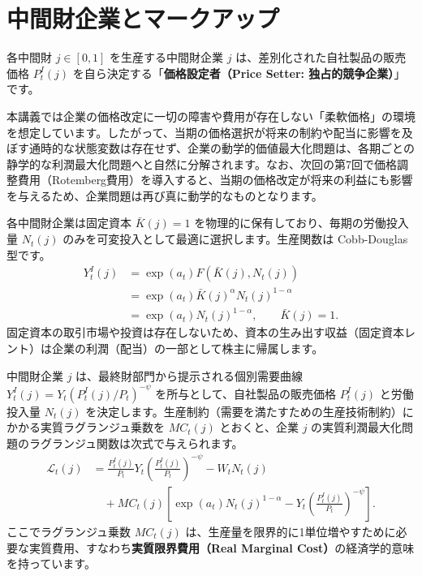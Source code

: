 \documentclass[
  japanese,
  lualatex,
  ja=standard,
  12pt,
  a4paper]{ltjsarticle}
\begin{document}
\section{中間財企業とマークアップ}\label{ux4e2dux9593ux8ca1ux4f01ux696dux3068ux30deux30fcux30afux30a2ux30c3ux30d7}

各中間財 \(j \in [0, 1]\) を生産する中間財企業 \(j\)
は、差別化された自社製品の販売価格 \(P_t^I(j)\)
を自ら決定する「\textbf{価格設定者（Price Setter:
独占的競争企業）}」です。

本講義では企業の価格改定に一切の障害や費用が存在しない「柔軟価格」の環境を想定しています。したがって、当期の価格選択が将来の制約や配当に影響を及ぼす通時的な状態変数は存在せず、企業の動学的価値最大化問題は、各期ごとの静学的な利潤最大化問題へと自然に分解されます。なお、次回の第7回で価格調整費用（Rotemberg費用）を導入すると、当期の価格改定が将来の利益にも影響を与えるため、企業問題は再び真に動学的なものとなります。

各中間財企業は固定資本 \(\bar{K}(j) = 1\)
を物理的に保有しており、毎期の労働投入量 \(N_t(j)\)
のみを可変投入として最適に選択します。生産関数は Cobb-Douglas 型です。
\[
\begin{aligned}
Y_t^I(j) &= \exp(a_t) F(\bar{K}(j), N_t(j))\\
&= \exp(a_t) \bar{K}(j)^\alpha N_t(j)^{1-\alpha}\\
&= \exp(a_t) N_t(j)^{1-\alpha}, \qquad \bar{K}(j)=1.
\end{aligned}
\]
固定資本の取引市場や投資は存在しないため、資本の生み出す収益（固定資本レント）は企業の利潤（配当）の一部として株主に帰属します。

中間財企業 \(j\) は、最終財部門から提示される個別需要曲線
\(Y_t^I(j) = Y_t (P_t^I(j)/P_t)^{-\psi}\)
を所与として、自社製品の販売価格 \(P_t^I(j)\) と労働投入量 \(N_t(j)\)
を決定します。生産制約（需要を満たすための生産技術制約）にかかる実質ラグランジュ乗数を
\(MC_t(j)\) とおくと、企業 \(j\)
の実質利潤最大化問題のラグランジュ関数は次式で与えられます。 \[
\begin{aligned}
\mathcal{L}_t(j)
&= \frac{P_t^I(j)}{P_t} Y_t \left( \frac{P_t^I(j)}{P_t} \right)^{-\psi}
 - W_t N_t(j)\\
&\quad + MC_t(j) \left[ \exp(a_t) N_t(j)^{1-\alpha}
 - Y_t \left( \frac{P_t^I(j)}{P_t} \right)^{-\psi} \right].
\end{aligned}
\] ここでラグランジュ乗数 \(MC_t(j)\)
は、生産量を限界的に1単位増やすために必要な実質費用、すなわち\textbf{実質限界費用（Real
Marginal Cost）}の経済学的意味を持っています。
\end{document}
